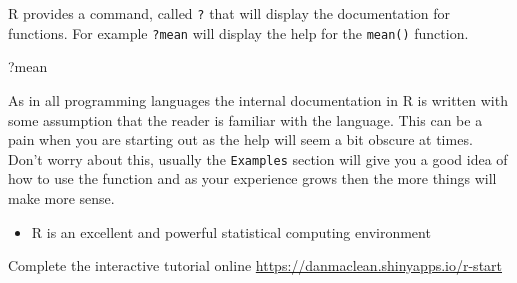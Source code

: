 \documentclass[
]{book}
\newenvironment{Shaded}{\begin{snugshade}}{\end{snugshade}}
\newcommand{\NormalTok}[1]{#1}
\providecommand{\tightlist}{%
  \setlength{\itemsep}{0pt}\setlength{\parskip}{0pt}}
\newenvironment{task}
{ \begin{tcolorbox}[title=For you to do,title filled] }
{  \end{tcolorbox} }
\newenvironment{roundup}
{ \begin{tcolorbox}[colbacktitle=yellow!50!white,
title=Round Up,coltitle=black,
fonttitle=\bfseries] }
{  \end{tcolorbox} }
\begin{document}
R provides a command, called \texttt{?} that will display the documentation for functions. For example \texttt{?mean} will display the help for the \texttt{mean()} function.

\begin{Shaded}
\begin{Highlighting}[]
\NormalTok{?mean}
\end{Highlighting}
\end{Shaded}

As in all programming languages the internal documentation in R is written with some assumption that the reader is familiar with the language. This can be a pain when you are starting out as the help will seem a bit obscure at times. Don't worry about this, usually the \texttt{Examples} section will give you a good idea of how to use the function and as your experience grows then the more things will make more sense.

\begin{roundup}
\begin{itemize}
\tightlist
\item
  R is an excellent and powerful statistical computing environment
\end{itemize}
\end{roundup}

\begin{task}
Complete the interactive tutorial online \url{https://danmaclean.shinyapps.io/r-start}
\end{task}

  
\end{document}
